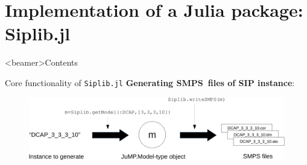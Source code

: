 \documentclass{beamer}
\newcommand{\smps}{\textsf{SMPS}}
\newcommand{\structjump}{\textsf{StructJuMP}}
\newcommand{\siplibjl}{\texttt{Siplib.jl}}
\begin{document}
%		
%		
%		
%		
%		
%		
%		


\section{Implementation of a Julia package: Siplib.jl}
\begin{frame}<beamer>{Contents}
\end{frame}	

\begin{frame}{Core functionality of \siplibjl}
\textbf{Generating \smps\ files of SIP instance}:
\begin{figure}
\begin{center}
\includegraphics[width=\textwidth]{siplib_package}
\end{center}
\end{figure}	
\end{frame}
\end{document}
